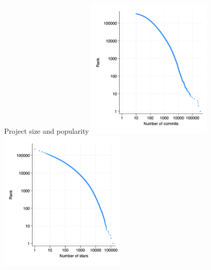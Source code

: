 \documentclass[
  ignorenonframetext,
  aspectratio=169,
]{beamer}
\begin{document}
\begin{frame}{Project size and popularity}
\protect\hypertarget{project-size-and-popularity}{}
\includegraphics[width=0.45\textwidth,height=\textheight]{figures/commits_rank.png}
\includegraphics[width=0.45\textwidth,height=\textheight]{figures/stars_rank.png}
\end{frame}
\end{document}

